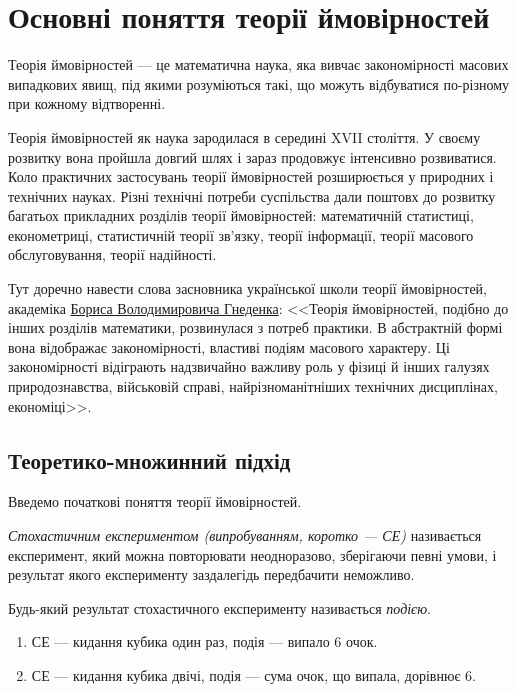 
\section{Основні поняття теорії ймовірностей}
Теорія ймовірностей --- це математична наука, яка вивчає закономірності масових випадкових явищ, під якими розуміються такі,
що можуть відбуватися по-різному при кожному відтворенні.

Теорія ймовірностей як наука зародилася в середині XVII століття. У своєму розвитку вона пройшла довгий шлях
і зараз продовжує інтенсивно розвиватися. Коло практичних застосувань теорії ймовірностей розширюється у природних і технічних науках.
Різні технічні потреби суспільства дали поштовх до розвитку багатьох прикладних розділів теорії ймовірностей: математичній статистиці,
економетриці, статистичній теорії зв'язку,
теорії інформації, теорії масового обслуговування, теорії надійності.

Тут доречно навести слова засновника української школи теорії ймовірностей,
академіка 
\href{https://uk.wikipedia.org/wiki/%D0%93%D0%BD%D1%94%D0%B4%D0%B5%D0%BD%D0%BA%D0%BE_%D0%91%D0%BE%D1%80%D0%B8%D1%81_%D0%92%D0%BE%D0%BB%D0%BE%D0%B4%D0%B8%D0%BC%D0%B8%D1%80%D0%BE%D0%B2%D0%B8%D1%87}{Бориса Володимировича Гнеденка}: 
<<Теорія ймовірностей, подібно до інших розділів математики, розвинулася з потреб практики.
В абстрактній формі вона відображає закономірності, властиві подіям масового характеру. Ці закономірності відіграють надзвичайно важливу
роль у фізиці й інших галузях природознавства, військовій справі, найрізноманітніших технічних дисциплінах, економіці>>.

\subsection{Теоретико-множинний підхід}
Введемо початкові поняття теорії ймовірностей.
\begin{definition}
    \emph{Стохастичним експериментом (випробуванням, коротко --- СЕ)} називається експеримент, 
    який можна повторювати неодноразово, зберігаючи певні умови, і результат якого 
    експерименту заздалегідь передбачити неможливо.
\end{definition}
\begin{definition}
    Будь-який результат стохастичного експерименту називається \emph{подією}.
\end{definition}
\begin{example}
    \begin{enumerate}
        \item СЕ --- кидання кубика один раз, подія --- випало 6 очок.
        \item СЕ --- кидання кубика двічі, подія --- сума очок, що випала, дорівнює 6.
    \end{enumerate}
\end{example}

